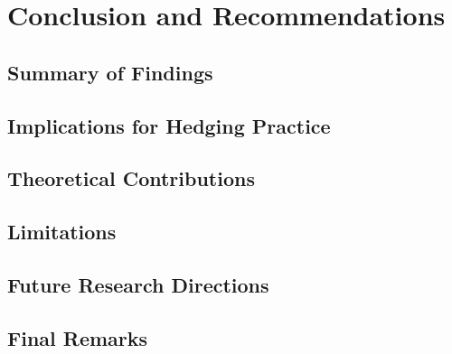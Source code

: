 
\section{Conclusion and Recommendations}
\label{sec:conclusion}


\subsection{Summary of Findings}
\label{subsec:summary}


\subsection{Implications for Hedging Practice}
\label{subsec:practical_implications}


\subsection{Theoretical Contributions}
\label{subsec:theoretical_contributions}


\subsection{Limitations}
\label{subsec:limitations}


\subsection{Future Research Directions}
\label{subsec:future_work}


\subsection{Final Remarks}
\label{subsec:final_remarks}

